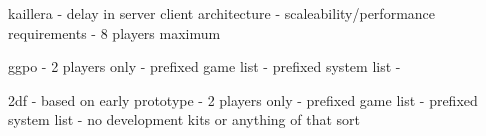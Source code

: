 \documentclass{article}
\begin{document}

kaillera
 - delay in server client architecture
 - scaleability/performance requirements
 - 8 players maximum

ggpo
 - 2 players only
 - prefixed game list
 - prefixed system list
 - 
 
2df
 - based on early prototype
 - 2 players only
 - prefixed game list
 - prefixed system list
 - no development kits or anything of that sort


\clearpage


\end{document}
